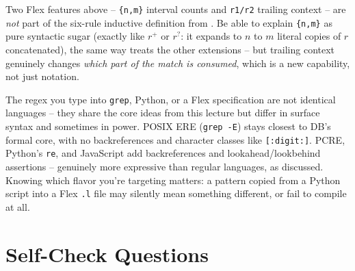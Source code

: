 \documentclass[full-course-notes.tex]{subfiles}
\begin{document}
\begin{examfocus}
Two Flex features above -- \texttt{\{n,m\}} interval counts and \texttt{r1/r2} trailing
context -- are \emph{not} part of the six-rule inductive definition from
. Be able to explain \texttt{\{n,m\}} as pure syntactic sugar
(exactly like $r^{+}$ or $r^{?}$: it expands to $n$ to $m$ literal copies of $r$ concatenated),
the same way  treats the other extensions -- but trailing context
genuinely changes \emph{which part of the match is consumed}, which is a new capability, not
just notation.
\end{examfocus}

\begin{historynote}
The regex you type into \texttt{grep}, Python, or a Flex specification are not identical
languages -- they share the core ideas from this lecture but differ in surface syntax and
sometimes in power. POSIX ERE (\texttt{grep -E}) stays closest to DB's formal core, with no
backreferences and character classes like \texttt{[:digit:]}. PCRE, Python's \texttt{re}, and
JavaScript add backreferences and lookahead/lookbehind assertions -- genuinely more expressive
than regular languages, as  discussed. Knowing which flavor
you're targeting matters: a pattern copied from a Python script into a Flex \texttt{.l} file may
silently mean something different, or fail to compile at all.
\end{historynote}

\section{Self-Check Questions}
\label{sec:l3-selfcheck}
\end{document}
